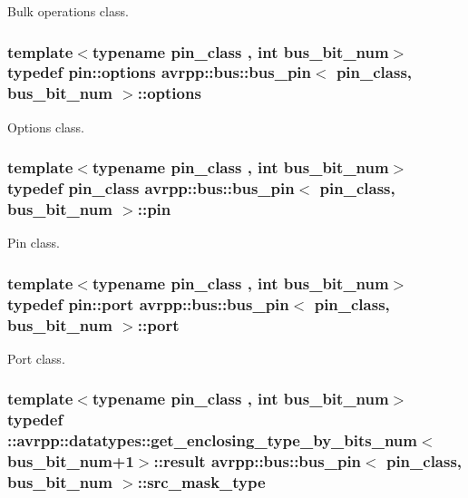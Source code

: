Bulk operations class. 

\hypertarget{structavrpp_1_1bus_1_1bus__pin_ac25ba32b110195ab3b0740a87d23beb8}{
\subsubsection[{options}]{\setlength{\rightskip}{0pt plus 5cm}template$<$typename pin\_\-class , int bus\_\-bit\_\-num$>$ typedef pin::options {\bf avrpp::bus::bus\_\-pin}$<$ pin\_\-class, bus\_\-bit\_\-num $>$::{\bf options}}}
\label{structavrpp_1_1bus_1_1bus__pin_ac25ba32b110195ab3b0740a87d23beb8}


Options class. 

\hypertarget{structavrpp_1_1bus_1_1bus__pin_ab740264ee1e092b8834aeb2f9b1cc609}{
\subsubsection[{pin}]{\setlength{\rightskip}{0pt plus 5cm}template$<$typename pin\_\-class , int bus\_\-bit\_\-num$>$ typedef pin\_\-class {\bf avrpp::bus::bus\_\-pin}$<$ pin\_\-class, bus\_\-bit\_\-num $>$::{\bf pin}}}
\label{structavrpp_1_1bus_1_1bus__pin_ab740264ee1e092b8834aeb2f9b1cc609}


Pin class. 

\hypertarget{structavrpp_1_1bus_1_1bus__pin_a771525e4bdbb69d510340efea54853b2}{
\subsubsection[{port}]{\setlength{\rightskip}{0pt plus 5cm}template$<$typename pin\_\-class , int bus\_\-bit\_\-num$>$ typedef pin::port {\bf avrpp::bus::bus\_\-pin}$<$ pin\_\-class, bus\_\-bit\_\-num $>$::{\bf port}}}
\label{structavrpp_1_1bus_1_1bus__pin_a771525e4bdbb69d510340efea54853b2}


Port class. 

\hypertarget{structavrpp_1_1bus_1_1bus__pin_a141afbd0ca9f7f94f69a74bbb26515ea}{
\subsubsection[{src\_\-mask\_\-type}]{\setlength{\rightskip}{0pt plus 5cm}template$<$typename pin\_\-class , int bus\_\-bit\_\-num$>$ typedef ::{\bf avrpp::datatypes::get\_\-enclosing\_\-type\_\-by\_\-bits\_\-num}$<$bus\_\-bit\_\-num+1$>$::result {\bf avrpp::bus::bus\_\-pin}$<$ pin\_\-class, bus\_\-bit\_\-num $>$::{\bf src\_\-mask\_\-type}}}
\label{structavrpp_1_1bus_1_1bus__pin_a141afbd0ca9f7f94f69a74bbb26515ea}


